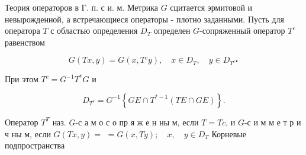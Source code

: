 \documentclass[10pt]{article}
\begin{document}
Теория операторов в Г. п. с и. м. Метрика $G$ сцитается эрмитовой и невырожденной, а встречающиеся операторы - плотно заданными. Пусть для оператора $T$ с областью определения $D_{T}$ определен $G$-сопряженный оператор $T^{c}$ равенством



\[

G(T x, y)=G\left(x, T{ }^{c} y\right), \quad x \in D_{T}, \quad y \in D_{T^{c \bullet}}

\]



При этом $T^{c}=G^{-1} T^{*} G$ и



\[

D_{T^{c}}=G^{-1}\left\{G E \cap T^{*-1}(T E \cap G E)\right\} .

\]



Оператор $T^{T}$ наз. $G$-с а м о с о пр я ж е н ны м, если $T=T c$, и $G$-с и м м е т р и ч ны м, если $G(T x, y)=$ $=G(x, T y) ; \quad x, \quad y \in D_{T}$ Корневые подпространства
\end{document}
